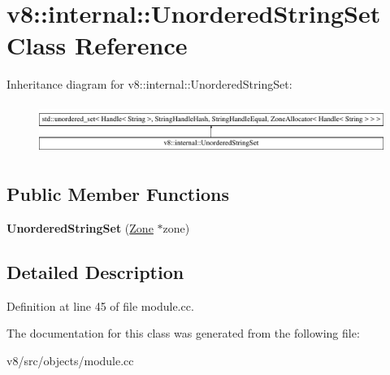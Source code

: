 \hypertarget{classv8_1_1internal_1_1UnorderedStringSet}{}\section{v8\+:\+:internal\+:\+:Unordered\+String\+Set Class Reference}
\label{classv8_1_1internal_1_1UnorderedStringSet}
Inheritance diagram for v8\+:\+:internal\+:\+:Unordered\+String\+Set\+:\begin{figure}[H]
\begin{center}
\leavevmode
\includegraphics[height=1.647059cm]{classv8_1_1internal_1_1UnorderedStringSet}
\end{center}
\end{figure}
\subsection*{Public Member Functions}
\begin{DoxyCompactItemize}
\item 
\mbox{\label{classv8_1_1internal_1_1UnorderedStringSet_a99b6bc0d52a1341273d1b283194cdd46}} 
{\bfseries Unordered\+String\+Set} (\mbox{\hyperlink{classv8_1_1internal_1_1Zone}{Zone}} $\ast$zone)
\end{DoxyCompactItemize}


\subsection{Detailed Description}


Definition at line 45 of file module.\+cc.



The documentation for this class was generated from the following file\+:\begin{DoxyCompactItemize}
\item 
v8/src/objects/module.\+cc\end{DoxyCompactItemize}
